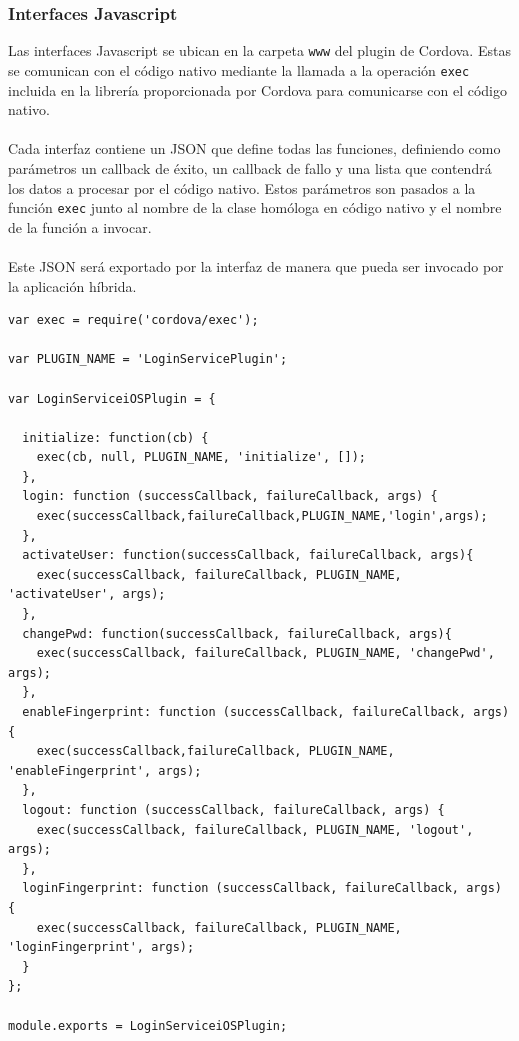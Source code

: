\documentclass[a4paper, 12pt]{article}
\newenvironment{code}{\captionsetup{type=listing}}{}
\begin{document}
\subsubsection{Interfaces Javascript}
\label{sec-4-3-4}
Las interfaces Javascript se ubican en la carpeta \verb~www~ del plugin de Cordova. Estas se comunican con el código nativo mediante la llamada a la operación \verb~exec~ incluida en la librería proporcionada por Cordova
para comunicarse con el código nativo.
\\
\\
Cada interfaz contiene un JSON que define todas las funciones, definiendo como parámetros un callback de éxito, un callback de fallo y una lista que contendrá los datos a procesar por el código nativo. Estos parámetros
son pasados a la función \verb~exec~ junto al nombre de la clase homóloga en código nativo y el nombre de la función a invocar.
\\
\\
Este JSON será exportado por la interfaz de manera que pueda ser invocado por la aplicación híbrida.
\begin{code}
\label{code:js-interface}
\begin{verbatim}
var exec = require('cordova/exec');

var PLUGIN_NAME = 'LoginServicePlugin';

var LoginServiceiOSPlugin = {

  initialize: function(cb) {
    exec(cb, null, PLUGIN_NAME, 'initialize', []);
  },
  login: function (successCallback, failureCallback, args) {
    exec(successCallback,failureCallback,PLUGIN_NAME,'login',args);
  },
  activateUser: function(successCallback, failureCallback, args){
    exec(successCallback, failureCallback, PLUGIN_NAME, 'activateUser', args);
  },
  changePwd: function(successCallback, failureCallback, args){
    exec(successCallback, failureCallback, PLUGIN_NAME, 'changePwd', args);
  },
  enableFingerprint: function (successCallback, failureCallback, args) {
    exec(successCallback,failureCallback, PLUGIN_NAME, 'enableFingerprint', args);
  },
  logout: function (successCallback, failureCallback, args) {
    exec(successCallback, failureCallback, PLUGIN_NAME, 'logout', args);
  },
  loginFingerprint: function (successCallback, failureCallback, args) {
    exec(successCallback, failureCallback, PLUGIN_NAME, 'loginFingerprint', args);
  }
};

module.exports = LoginServiceiOSPlugin;

\end{verbatim}
\end{code}
\end{document}
